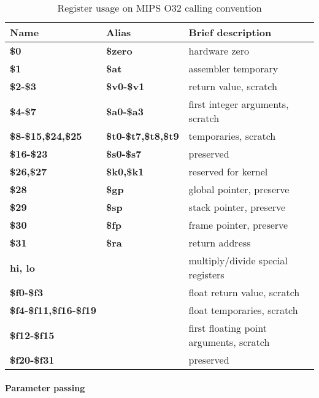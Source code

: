 \begin{table}[h]
\begin{tabular*}{0.95\textwidth}{lll}
Name                         & Alias                     & Brief description\\
\hline                                                             
{\bf \$0}                    & {\bf \$zero}              & hardware zero \\
{\bf \$1}                    & {\bf \$at}                & assembler temporary \\
{\bf \$2-\$3}                & {\bf \$v0-\$v1}           & return value, scratch \\
{\bf \$4-\$7}                & {\bf \$a0-\$a3}           & first integer arguments, scratch\\
{\bf \$8-\$15,\$24,\$25}     & {\bf \$t0-\$t7,\$t8,\$t9} & temporaries, scratch \\
{\bf \$16-\$23}              & {\bf \$s0-\$s7}           & preserved \\
{\bf \$26,\$27}              & {\bf \$k0,\$k1}           & reserved for kernel \\
{\bf \$28}                   & {\bf \$gp}                & global pointer, preserve \\
{\bf \$29}                   & {\bf \$sp}                & stack pointer, preserve \\
{\bf \$30}                   & {\bf \$fp}                & frame pointer, preserve \\
{\bf \$31}                   & {\bf \$ra}                & return address \\
{\bf hi, lo}                 &                           & multiply/divide special registers \\
{\bf \$f0-\$f3}              &                           & float return value, scratch \\
{\bf \$f4-\$f11,\$f16-\$f19} &                           & float temporaries, scratch \\
{\bf \$f12-\$f15}            &                           & first floating point arguments, scratch \\
{\bf \$f20-\$f31}            &                           & preserved \\
\end{tabular*}
\caption{Register usage on MIPS O32 calling convention}
\end{table}

\paragraph{Parameter passing}


